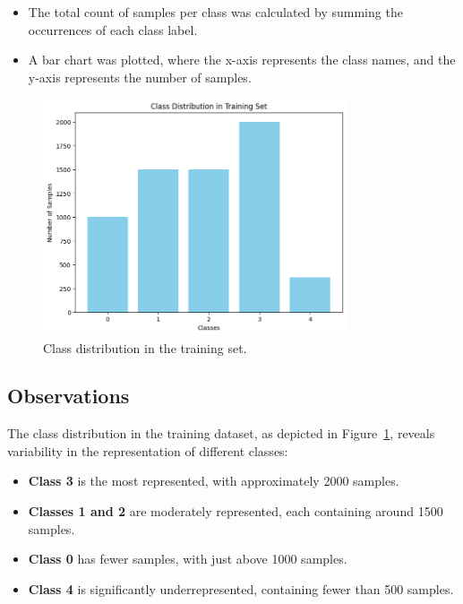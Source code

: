 \documentclass{article}
\begin{document}
\begin{itemize}
    \item The total count of samples per class was calculated by summing the occurrences of each class label.
    \item A bar chart was plotted, where the x-axis represents the class names, and the y-axis represents the number of samples.
\end{itemize}

\begin{figure}[h!]
    \centering
    \includegraphics[width=0.8\textwidth]{class_distribution.png}
    \caption{Class distribution in the training set.}
    \label{fig:class_distribution}
\end{figure}

\newpage

\subsection{Observations}

The class distribution in the training dataset, as depicted in Figure~\ref{fig:class_distribution}, reveals variability in the representation of different classes:

\begin{itemize}
    \item \textbf{Class 3} is the most represented, with approximately 2000 samples.
    \item \textbf{Classes 1 and 2} are moderately represented, each containing around 1500 samples.
    \item \textbf{Class 0} has fewer samples, with just above 1000 samples.
    \item \textbf{Class 4} is significantly underrepresented, containing fewer than 500 samples.
\end{itemize}
\end{document}
